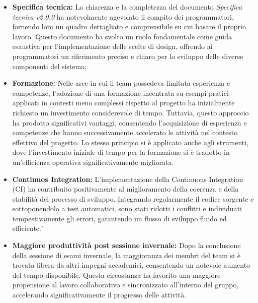 \begin{itemize}
    \item \textbf{Specifica tecnica:} La chiarezza e la completezza del documento \textit{Specifica tecnica v2.0.0} ha notevolmente agevolato il compito dei programmatori, fornendo loro un quadro dettagliato e comprensibile su cui basare il proprio lavoro. Questo documento ha svolto un ruolo fondamentale come guida esaustiva per l'implementazione delle scelte di design, offrendo ai programmatori un riferimento preciso e chiaro per lo sviluppo delle diverse componenti del sistema;
    \item \textbf{Formazione:} Nelle aree in cui il team possedeva limitata esperienza e competenze, l'adozione di una formazione incentrata su esempi pratici applicati in contesti meno complessi rispetto al progetto ha inizialmente richiesto un investimento considerevole di tempo. Tuttavia, questo approccio ha prodotto significativi vantaggi, consentendo l'acquisizione di esperienza e competenze che hanno successivamente accelerato le attività nel contesto effettivo del progetto. Lo stesso principio si è applicato anche agli strumenti, dove l'investimento iniziale di tempo per la formazione si è tradotto in un'efficienza operativa significativamente migliorata.
    \item \textbf{Continuos Integration:} L'implementazione della Continuous Integration (CI) ha contribuito positivamente al miglioramento della coerenza e della stabilità del processo di sviluppo. Integrando regolarmente il codice sorgente e sottoponendolo a test automatici, sono stati ridotti i conflitti e individuati tempestivamente gli errori, garantendo un flusso di sviluppo fluido ed efficiente."
    \item \textbf{Maggiore produttività post sessione invernale:} Dopo la conclusione della sessione di esami invernale, la maggioranza dei membri del team si è trovata libera da altri impegni accademici, consentendo un notevole aumento del tempo disponibile. Questa circostanza ha favorito una maggiore propensione al lavoro collaborativo e sincronizzato all'interno del gruppo, accelerando significativamente il progresso delle attività.
\end{itemize}